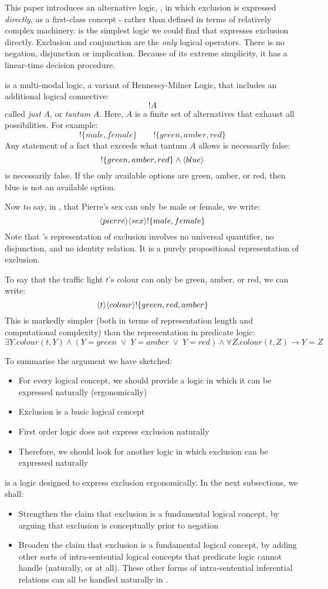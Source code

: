 This paper introduces an alternative logic, \ELFULL{}, in which exclusion is expressed \emph{directly}, as a first-class concept - rather than defined in terms of relatively complex machinery.
\ELFULL{} is the simplest logic we could find that expresses exclusion directly. 
Exclusion and conjunction are the \emph{only} logical operators. 
There is no negation, disjunction or implication.
Because of its extreme simplicity, it has a linear-time decision procedure.

\ELFULL{} is a multi-modal logic, a variant of Hennessy-Milner Logic, that includes an additional logical connective:
\[
   !A
\]
called \emph{just} $A$, or \emph{tantum} $A$.
Here, $A$ is a finite set of alternatives that exhaust all
possibilities. 
For example:
\[
   !\{male, female\}
      \qquad
   !\{green, amber, red\}
\]
Any statement of a fact that exceeds what tantum $A$ allows is necessarily false:
\[
   !\{green, amber, red\} \land \langle blue \rangle \]
is necessarily false.
If the only available options are green, amber, or red, then blue is not an available option.

Now to say, in \ELFULL{}, that Pierre's sex can only be male or female, we write:
\[
\langle pierre \rangle \langle sex \rangle !\{male, female\}
\]
Note that \ELFULL{}'s representation of exclusion involves no universal quantifier, no disjunction, and no identity relation.
It is a purely propositional representation of exclusion.

To say that the traffic light $t$'s colour can only be green, amber, or red, we can write:
\[
\langle t \rangle \langle colour \rangle !\{green, red, amber\}
\]
This is markedly simpler (both in terms of representation length and computational complexity) than the representation in predicate logic:
\[
\exists Y . colour(t,Y) \land (Y = green \; \lor \; Y = amber \; \lor \; Y = red) \land \forall Z . colour(t,Z) \rightarrow Y = Z
\]

To summarise the argument we have sketched:
\begin{itemize}
\item
For every logical concept, we should provide a logic in which it can be expressed naturally (ergonomically)
\item
Exclusion is a basic logical concept
\item
First order logic does not express exclusion naturally
\item
Therefore, we should look for another logic in which exclusion can be expressed naturally
\end{itemize}
\ELFULL{} is a logic designed to express exclusion ergonomically.
In the next subsections, we shall:
\begin{itemize}
\item
Strengthen the claim that exclusion is a fundamental logical concept, by arguing that exclusion is conceptually prior to negation
\item
Broaden the claim that exclusion is a fundamental logical concept, by adding other sorts of intra-sentential logical concepts that predicate logic cannot handle (naturally, or at all). These other forms of intra-sentential inferential relations can all be handled naturally in \ELFULL{}.
\end{itemize}

